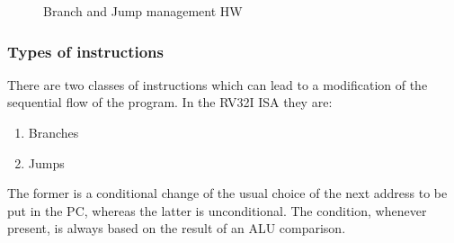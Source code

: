 \documentclass[a4paper]{article}
\begin{document}
\begin{figure}[hbtp]
    \centering
    \caption{Branch and Jump management HW}
    \label{fig:brJump_man_HW}
\end{figure}

\subsubsection{Types of instructions}
There are two classes of instructions which can lead to a modification of the sequential flow of the program. In the RV32I ISA they are:
\begin{enumerate}
	\item Branches
	\item Jumps
\end{enumerate} 
The former is a conditional change of the usual choice of the next address to be put in the PC, whereas the latter is unconditional. The condition, whenever present, is always based on the result of an ALU comparison.
\end{document}
